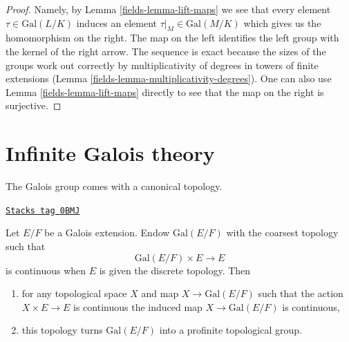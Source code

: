 \begin{proof}

Namely, by Lemma \ref{fields-lemma-lift-maps}
we see that every element $\tau \in \text{Gal}(L/K)$ induces an element
$\tau|_M \in \text{Gal}(M/K)$ which gives us the homomorphism on the
right. The map on the left identifies the left group with the kernel
of the right arrow. The sequence is exact because the sizes
of the groups work out correctly by multiplicativity of degrees
in towers of finite extensions
(Lemma \ref{fields-lemma-multiplicativity-degrees}).
One can also use Lemma \ref{fields-lemma-lift-maps}
directly to see that the map on the right is surjective.
\end{proof}

\section{Infinite Galois theory}
\label{fields-section-infinite-galois}
The Galois group comes with a canonical topology.

\begin{lemma}
\label{fields-lemma-galois-profinite}
\href{https://stacks.math.columbia.edu/tag/0BMJ}{\texttt{Stacks tag 0BMJ}}

Let $E/F$ be a Galois extension. Endow $\text{Gal}(E/F)$ with the coarsest
topology such that
$$
\text{Gal}(E/F) \times E \longrightarrow E
$$
is continuous when $E$ is given the discrete topology. Then
\begin{enumerate}
\item for any topological space $X$ and map $X \to \text{Gal}(E/F)$
such that the action $X \times E \to E$ is continuous the induced map
$X \to \text{Gal}(E/F)$ is continuous,
\item this topology turns $\text{Gal}(E/F)$ into
a profinite topological group.
\end{enumerate}
\end{lemma}

